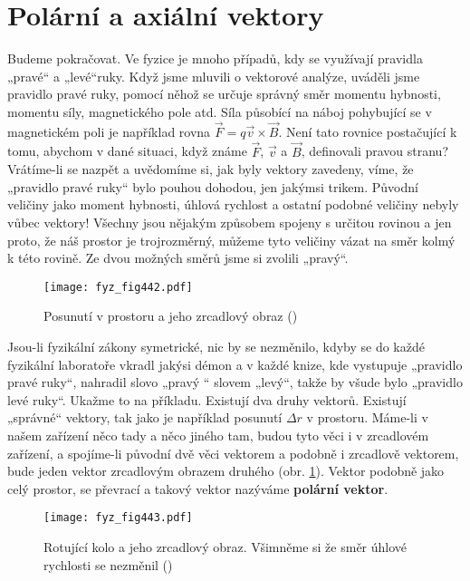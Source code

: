   \section{Polární a axiální vektory}\label{fyz:IchapLIIsecV}
    Budeme pokračovat. Ve fyzice je mnoho případů, kdy se využívají pravidla „pravé“ a „levé“ruky.
    Když jsme mluvili o vektorové analýze, uváděli jsme pravidlo pravé ruky, pomocí něhož se určuje
    správný směr momentu hybnosti, momentu síly, magnetického pole atd. Síla působící na náboj
    pohybující se v magnetickém poli je například rovna \(\vec{F} = q \vec{v}\times\vec{B}\). Není
    tato rovnice postačující k tomu, abychom v dané situaci, když známe \(\vec{F}\), \(\vec{v}\) a
    \(\vec{B}\), deﬁnovali pravou stranu? Vrátíme-li se nazpět a uvědomíme si, jak byly vektory
    zavedeny, víme, že „pravidlo pravé ruky“ bylo pouhou dohodou, jen jakýmsi trikem. Původní
    veličiny jako moment hybnosti, úhlová rychlost a ostatní podobné veličiny nebyly vůbec vektory!
    Všechny jsou nějakým způsobem spojeny s určitou rovinou a jen proto, že náš prostor je
    trojrozměrný, můžeme tyto veličiny vázat na směr kolmý k této rovině. Ze dvou možných směrů jsme
    si zvolili „pravý“.

    \begin{figure}[ht!] %
      \centering
      \texttt{[image: fyz\_fig442.pdf]}
      \caption{Posunutí v prostoru a jeho zrcadlový obraz (\cite[s.~706]{Feynman01})}
      \label{fyz:fig442}
    \end{figure}

    Jsou-li fyzikální zákony symetrické, nic by se nezměnilo, kdyby se do každé fyzikální laboratoře
    vkradl jakýsi démon a v každé knize, kde vystupuje „pravidlo pravé ruky“, nahradil slovo „pravý
    “ slovem „levý“, takže by všude bylo „pravidlo levé ruky“. Ukažme to na příkladu. Existují dva
    druhy vektorů. Existují „správné“ vektory, tak jako je například posunutí \(\Delta r\) v
    prostoru. Máme-li v našem zařízení něco tady a něco jiného tam, budou tyto věci i v zrcadlovém
    zařízení, a spojíme-li původní dvě věci vektorem a podobně i zrcadlově vektorem, bude jeden
    vektor zrcadlovým obrazem druhého (obr. \ref{fyz:fig442}). Vektor podobně jako celý prostor, se
    převrací a takový vektor nazýváme \textbf{polární vektor}.

    \begin{figure}[ht!] %
      \centering
      \texttt{[image: fyz\_fig443.pdf]}
      \caption{Rotující kolo a jeho zrcadlový obraz. Všimněme si že směr  úhlové 
               rychlosti se nezměnil (\cite[s.~706]{Feynman01})}
      \label{fyz:fig443}
    \end{figure}

